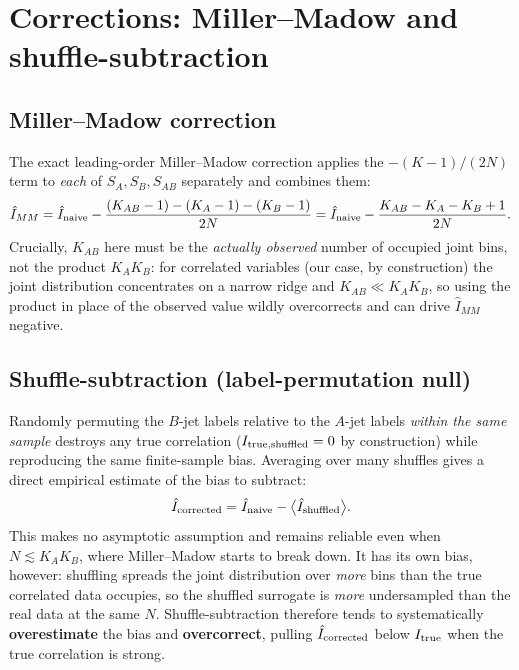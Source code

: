 \documentclass[11pt]{article}
\newcommand{\Itrue}{I_{\rm true}}
\begin{document}
\section{Corrections: Miller--Madow and shuffle-subtraction}
\label{sec:corrections}

\subsection{Miller--Madow correction}

The exact leading-order Miller--Madow correction applies the
$-(K-1)/(2N)$ term to \emph{each} of $S_A,S_B,S_{AB}$ separately and
combines them:
\begin{equation}
\hat I_{MM} = \hat I_{\rm naive} - \frac{(K_{AB}-1)-(K_A-1)-(K_B-1)}{2N}
= \hat I_{\rm naive} - \frac{K_{AB}-K_A-K_B+1}{2N}.
\end{equation}
Crucially, $K_{AB}$ here must be the \emph{actually observed} number of
occupied joint bins, not the product $K_AK_B$: for correlated variables
(our case, by construction) the joint distribution concentrates on a
narrow ridge and $K_{AB}\ll K_AK_B$, so using the product in place of the
observed value wildly overcorrects and can drive $\hat I_{MM}$ negative.

\subsection{Shuffle-subtraction (label-permutation null)}

Randomly permuting the $B$-jet labels relative to the $A$-jet labels
\emph{within the same sample} destroys any true correlation
($I_{\rm true,shuffled}=0$ by construction) while reproducing the same
finite-sample bias. Averaging over many shuffles gives a direct empirical
estimate of the bias to subtract:
\begin{equation}
\hat I_{\rm corrected} = \hat I_{\rm naive} -
\big\langle \hat I_{\rm shuffled}\big\rangle .
\end{equation}
This makes no asymptotic assumption and remains reliable even when
$N\lesssim K_AK_B$, where Miller--Madow starts to break down. It has its
own bias, however: shuffling spreads the joint distribution over
\emph{more} bins than the true correlated data occupies, so the shuffled
surrogate is \emph{more} undersampled than the real data at the same $N$.
Shuffle-subtraction therefore tends to systematically
\textbf{overestimate} the bias and \textbf{overcorrect}, pulling
$\hat I_{\rm corrected}$ below $\Itrue$ when the true correlation is
strong.
\end{document}
